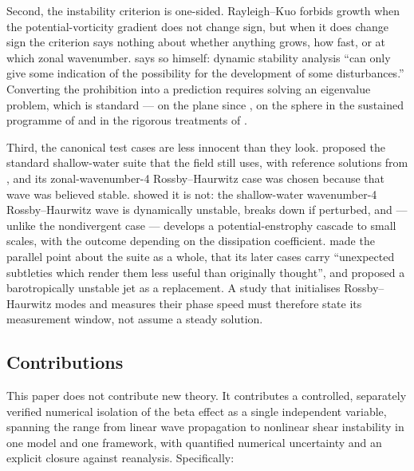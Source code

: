 Second, the instability criterion is one-sided. Rayleigh--Kuo forbids growth when
the potential-vorticity gradient does not change sign, but when it does change
sign the criterion says nothing about whether anything grows, how fast, or at
which zonal wavenumber. \citet{kuo1949} says so himself: dynamic stability
analysis ``can only give some indication of the possibility for the development of
some disturbances.'' Converting the prohibition into a prediction requires solving
an eigenvalue problem, which is standard --- on the plane since
\citet{kuo1949}, on the sphere in the sustained programme of
\citet{skiba2004,skiba2008,skiba2024} and in the rigorous treatments of
\citet{constantin2022}.

Third, the canonical test cases are less innocent than they look.
\citet{williamson1992} proposed the standard shallow-water suite that the field
still uses, with reference solutions from \citet{jakobchien1995}, and its
zonal-wavenumber-4 Rossby--Haurwitz case was chosen because that wave was believed
stable. \citet{thuburn2000} showed it is not: the shallow-water
wavenumber-4 Rossby--Haurwitz wave is dynamically unstable, breaks down if
perturbed, and --- unlike the nondivergent case --- develops a potential-enstrophy
cascade to small scales, with the outcome depending on the dissipation
coefficient. \citet{galewsky2004} made the parallel point about the suite as a
whole, that its later cases carry ``unexpected subtleties which render them less
useful than originally thought'', and proposed a barotropically unstable jet as a
replacement. A study that initialises Rossby--Haurwitz modes and measures their
phase speed must therefore state its measurement window, not assume a steady
solution.

\subsection{Contributions}

This paper does not contribute new theory. It contributes a controlled,
separately verified numerical isolation of the beta effect as a single independent
variable, spanning the range from linear wave propagation to nonlinear shear
instability in one model and one framework, with quantified numerical uncertainty
and an explicit closure against reanalysis. Specifically:

